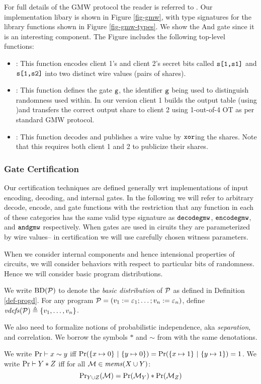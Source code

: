 For full details of the GMW protocol the reader is referred to
\cite{evans2018pragmatic}. Our implementation libary is shown in
Figure \ref{fig-gmw}, with type signatures for the library functions
shown in Figure \ref{fig-gmw-types}. We show the And gate since it is
an interesting component. The Figure includes the
following top-level functions:
\begin{itemize}
\item {}: This function encodes client 1's and client 2's
  secret bits called $\texttt{s[1,s1]}$ and $\texttt{s[1,s2]}$ into two
  distinct wire values (pairs of shares).
\item {}: This function defines the gate $\texttt{g}$, the
  identifier $\texttt{g}$ being used to distinguish randomness used
  within.  In our version client 1 builds the output table (using
  )and transfers the correct output share to client 2
  using 1-out-of-4 OT as per standard GMW protocol.
\item {}: This function decodes and publishes a wire value
  by $\texttt{xor}$ing the shares. Note that this requires both client 1
  and 2 to publicize their shares.
\end{itemize}

\subsubsection{Gate Certification}

Our certification techniques are defined generally wrt implementations
of input encoding, decoding, and internal gates. In the following we
will refer to arbitrary decode, encode, and gate functions with the
restriction that any function in each of these categories has the same
valid type signature as $\texttt{decodegmw}$, $\texttt{encodegmw}$, and
$\texttt{andgmw}$ respectively. When gates are used in ciruits they are
parameterized by wire values-- in certification we will use carefully
chosen witness parameters. 

When we consider internal components and hence intensional properties
of circuits, we will consider behaviors with respect to particular bits
of randomness. Hence we will consider basic program distributions. 
\begin{definition}
  We write $\mathrm{BD}(\mathcal{P})$ to denote the \emph{basic distribution} of
  $\mathcal{P}$ as defined in Definition \ref{def-progd}. For any program $\mathcal{P} =
  (v_1 := \varepsilon_1;\ldots;v_n := \varepsilon_n)$, define
  $\mathit{vdefs}(\mathcal{P}) \triangleq \{ v_1,\ldots,v_n \}$.
\end{definition}
We also need to formalize notions of probabilistic independence, aka
\emph{separation}, and correlation. We borrow the symbols $*$ and $\sim$
from \cite{barthe2019probabilistic} with the same denotations.
\begin{definition}
  We write $\mathrm{Pr} \vdash x \sim y$ iff $\mathrm{Pr}(\{ x \mapsto 0\}\ |\ \{ y \mapsto 0 \}) =
  \mathrm{Pr}(\{ x \mapsto 1\}\ |\ \{ y \mapsto 1 \}) = 1$.
  We write $\mathrm{Pr} \vdash Y * Z$ iff for all
    $\mathcal{M} \in \mathit{mems}(X \cup Y)$:
  $${\mathrm{Pr}}_{Y \cup Z}(\mathcal{M}) =
  \mathrm{Pr}(\mathcal{M}_Y) * \mathrm{Pr}(\mathcal{M}_Z)$$ 
\end{definition}

